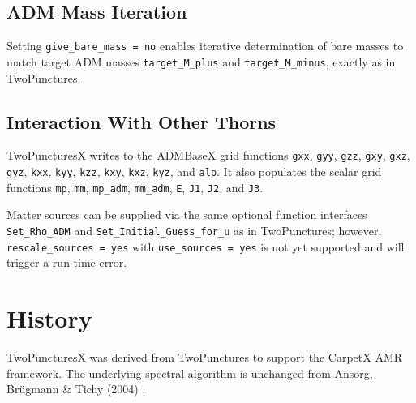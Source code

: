 \subsection{ADM Mass Iteration}

Setting \texttt{give\_bare\_mass = no} enables iterative determination of
bare masses to match target ADM masses \texttt{target\_M\_plus} and
\texttt{target\_M\_minus}, exactly as in TwoPunctures.

\subsection{Interaction With Other Thorns}

TwoPuncturesX writes to the ADMBaseX grid functions \texttt{gxx}, \texttt{gyy},
\texttt{gzz}, \texttt{gxy}, \texttt{gxz}, \texttt{gyz}, \texttt{kxx},
\texttt{kyy}, \texttt{kzz}, \texttt{kxy}, \texttt{kxz}, \texttt{kyz}, and
\texttt{alp}.  It also populates the scalar grid functions \texttt{mp},
\texttt{mm}, \texttt{mp\_adm}, \texttt{mm\_adm}, \texttt{E}, \texttt{J1},
\texttt{J2}, and \texttt{J3}.

Matter sources can be supplied via the same optional function interfaces
\texttt{Set\_Rho\_ADM} and \texttt{Set\_Initial\_Guess\_for\_u} as in
TwoPunctures; however, \texttt{rescale\_sources = yes} with
\texttt{use\_sources = yes} is not yet supported and will trigger a run-time
error.

\section{History}

TwoPuncturesX was derived from TwoPunctures to support the CarpetX AMR
framework.  The underlying spectral algorithm is unchanged from Ansorg,
Br\"ugmann \& Tichy (2004) \cite{einsteininitialdata_TwoPuncturesX_Ansorg04}.

